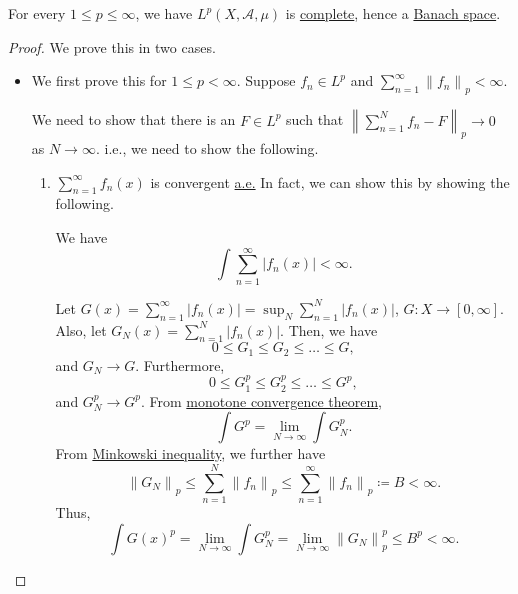 \begin{theorem}\label{thm:Riesz-Fischer-theorem}
	For every \(1\leq p\leq \infty \), we have \(L^p(X, \mathcal{A} , \mu )\) is \hyperref[def:complete]{complete}, hence a
	\hyperref[def:Banach-space]{Banach space}.
\end{theorem}
\begin{proof}
	We prove this in two cases.
	\begin{itemize}
		\item We first prove this for \(1\leq p<\infty \). Suppose \(f_{n} \in L^p\) and \(\sum_{n=1}^{\infty} \left\lVert f_{n} \right\rVert_{p}<\infty \).

		      We need to show that there is an \(F\in L^p\) such that \(\left\lVert \sum_{n=1}^{N} f_{n} -F\right\rVert_{p}\to 0\) as \(N\to \infty \). i.e., we need to show
		      the following.
		      \begin{enumerate}
			      \item \(\sum_{n=1}^{\infty} f_{n}(x)\) is convergent \hyperref[def:mu-almost-everywhere]{a.e.} In fact, we can show this by showing the following.
			            \begin{claim}
				            We have
				            \[
					            \int \sum_{n=1}^{\infty} \left\vert f_{n} (x) \right\vert < \infty .
				            \]
			            \end{claim}
			            \begin{explanation}
				            Let \(G(x) = \sum_{n=1}^{\infty} \left\vert f_{n} (x) \right\vert = \sup _N \sum_{n=1}^{N} \left\vert f_{n} (x) \right\vert  \), \(G\colon X\to [0, \infty ]\). Also, let
				            \(G_{N} (x)= \sum_{n=1}^{N} \left\vert f_{n} (x) \right\vert \). Then, we have
				            \[
					            0\leq G_{1} \leq G_2 \leq \dots \leq G,
				            \]
				            and \(G_{N} \to G \). Furthermore,
				            \[
					            0\leq G^p_1 \leq G^p_2 \leq \dots \leq G^p,
				            \]
				            and \(G^p_N \to G^p\). From \hyperref[thm:MCT]{monotone convergence theorem},
				            \[
					            \int G^p = \lim_{N \to \infty} \int G^p_N.
				            \]
				            From \hyperref[thm:Minkowski-inequality]{Minkowski inequality}, we further have
				            \[
					            \left\lVert G_N\right\rVert _p \leq \sum_{n=1}^{N} \left\lVert f_{n} \right\rVert _p \leq \sum_{n=1}^{\infty} \left\lVert f_{n} \right\rVert _p \coloneqq B < \infty.
				            \]
				            Thus,
				            \[
					            \int G(x)^p = \lim_{N \to \infty} \int G^p_N = \lim_{N \to \infty} \left\lVert G_{N} \right\rVert ^p_p \leq B^{p} < \infty .
\]
\end{explanation}
\end{enumerate}
\end{itemize}
\end{proof}
